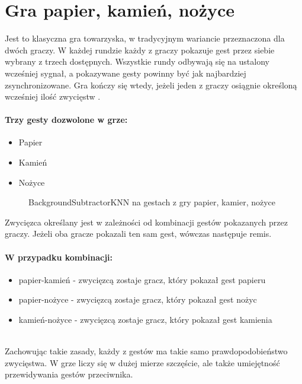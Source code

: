 \documentclass[a4paper,12pt,twoside,openany]{report}
\newcommand{\ImgPath}{.}
\begin{document}
\section{Gra papier, kamień, nożyce}
Jest to klasyczna gra towarzyska, w tradycyjnym wariancie przeznaczona dla dwóch graczy. W każdej rundzie każdy z graczy pokazuje gest przez siebie wybrany z trzech dostępnych. Wszystkie rundy odbywają się na ustalony wcześniej sygnał, a pokazywane gesty powinny być jak najbardziej zsynchronizowane. Gra kończy się wtedy, jeżeli jeden z graczy osiągnie określoną wcześniej ilość zwycięstw \cite{Fisher}.


\paragraph{Trzy gesty dozwolone w grze:}
\begin{itemize} 
	\item Papier
	\item Kamień
	\item Nożyce
\end{itemize} 

\begin{figure}[H]
	\centering
	\caption{BackgroundSubtractorKNN na gestach z gry papier, kamier, nożyce}
\end{figure}

Zwycięzca określany jest w zależności od kombinacji gestów pokazanych przez graczy. Jeżeli oba gracze pokazali ten sam gest, wówczas następuje remis. 

\paragraph{W przypadku kombinacji:}
\begin{itemize} 
	\item papier-kamień - zwycięzcą zostaje gracz, który pokazał gest papieru
	\item papier-nożyce - zwycięzcą zostaje gracz, który pokazał gest nożyc
	\item kamień-nożyce - zwycięzcą zostaje gracz, który pokazał gest kamienia
\end{itemize} 
\mbox{} \\	
Zachowując takie zasady, każdy z gestów ma takie samo prawdopodobieństwo zwycięstwa. W grze liczy się w dużej mierze szczęście, ale także umiejętność przewidywania gestów przeciwnika.
\end{document}
